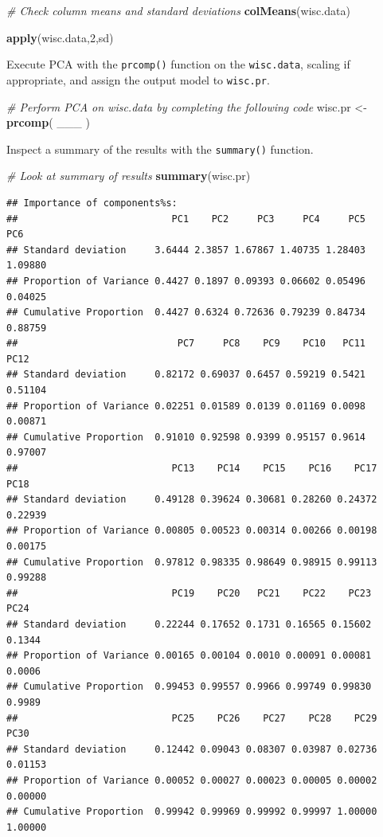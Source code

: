 \documentclass[]{article}
\newenvironment{Shaded}{\begin{snugshade}}{\end{snugshade}}
\newcommand{\KeywordTok}[1]{\textcolor[rgb]{0.13,0.29,0.53}{\textbf{#1}}}
\newcommand{\DecValTok}[1]{\textcolor[rgb]{0.00,0.00,0.81}{#1}}
\newcommand{\StringTok}[1]{\textcolor[rgb]{0.31,0.60,0.02}{#1}}
\newcommand{\CommentTok}[1]{\textcolor[rgb]{0.56,0.35,0.01}{\textit{#1}}}
\newcommand{\NormalTok}[1]{#1}
\begin{document}
\begin{Shaded}
\begin{Highlighting}[]
\CommentTok{# Check column means and standard deviations}
\KeywordTok{colMeans}\NormalTok{(wisc.data)}

\KeywordTok{apply}\NormalTok{(wisc.data,}\DecValTok{2}\NormalTok{,sd)}
\end{Highlighting}
\end{Shaded}

Execute PCA with the \texttt{prcomp()} function on the
\texttt{wisc.data}, scaling if appropriate, and assign the output model
to \texttt{wisc.pr}.

\begin{Shaded}
\begin{Highlighting}[]
\CommentTok{# Perform PCA on wisc.data by completing the following code}
\NormalTok{wisc.pr <-}\StringTok{ }\KeywordTok{prcomp}\NormalTok{( ___ )}
\end{Highlighting}
\end{Shaded}

Inspect a summary of the results with the \texttt{summary()} function.

\begin{Shaded}
\begin{Highlighting}[]
\CommentTok{# Look at summary of results}
\KeywordTok{summary}\NormalTok{(wisc.pr)}
\end{Highlighting}
\end{Shaded}

\begin{verbatim}
## Importance of components%s:
##                           PC1    PC2     PC3     PC4     PC5     PC6
## Standard deviation     3.6444 2.3857 1.67867 1.40735 1.28403 1.09880
## Proportion of Variance 0.4427 0.1897 0.09393 0.06602 0.05496 0.04025
## Cumulative Proportion  0.4427 0.6324 0.72636 0.79239 0.84734 0.88759
##                            PC7     PC8    PC9    PC10   PC11    PC12
## Standard deviation     0.82172 0.69037 0.6457 0.59219 0.5421 0.51104
## Proportion of Variance 0.02251 0.01589 0.0139 0.01169 0.0098 0.00871
## Cumulative Proportion  0.91010 0.92598 0.9399 0.95157 0.9614 0.97007
##                           PC13    PC14    PC15    PC16    PC17    PC18
## Standard deviation     0.49128 0.39624 0.30681 0.28260 0.24372 0.22939
## Proportion of Variance 0.00805 0.00523 0.00314 0.00266 0.00198 0.00175
## Cumulative Proportion  0.97812 0.98335 0.98649 0.98915 0.99113 0.99288
##                           PC19    PC20   PC21    PC22    PC23   PC24
## Standard deviation     0.22244 0.17652 0.1731 0.16565 0.15602 0.1344
## Proportion of Variance 0.00165 0.00104 0.0010 0.00091 0.00081 0.0006
## Cumulative Proportion  0.99453 0.99557 0.9966 0.99749 0.99830 0.9989
##                           PC25    PC26    PC27    PC28    PC29    PC30
## Standard deviation     0.12442 0.09043 0.08307 0.03987 0.02736 0.01153
## Proportion of Variance 0.00052 0.00027 0.00023 0.00005 0.00002 0.00000
## Cumulative Proportion  0.99942 0.99969 0.99992 0.99997 1.00000 1.00000
\end{verbatim}
\end{document}
